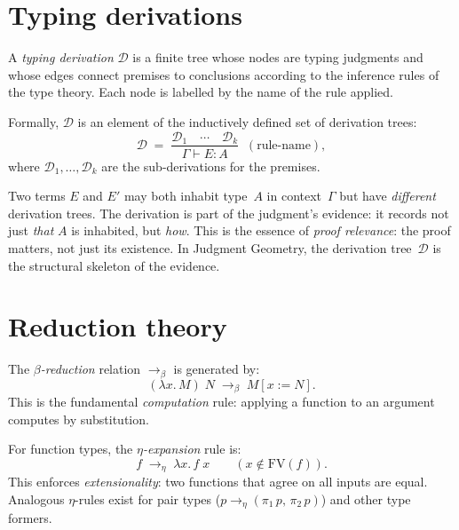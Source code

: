 \section{Typing derivations}
\label{sec:derivations}

\begin{definition}
\label{def:derivation}
A \emph{typing derivation} $\mathcal{D}$ is a finite tree whose nodes
are typing judgments and whose edges connect premises to conclusions
according to the inference rules of the type theory.  Each node is
labelled by the name of the rule applied.

Formally, $\mathcal{D}$ is an element of the inductively defined set
of derivation trees:
\[
  \mathcal{D} \;=\;
  \frac{\mathcal{D}_1 \quad \cdots \quad \mathcal{D}_k}
  {\Gamma \vdash E : A}\;\; (\text{rule-name}),
\]
where $\mathcal{D}_1, \ldots, \mathcal{D}_k$ are the sub-derivations
for the premises.
\end{definition}

\begin{remark}
\label{rem:proof-relevance}
Two terms $E$ and $E'$ may both inhabit type~$A$ in context~$\Gamma$
but have \emph{different} derivation trees.  The derivation is
part of the judgment's evidence: it records not just \emph{that} $A$ is
inhabited, but \emph{how}.  This is the essence of
\emph{proof relevance}: the proof matters, not just its existence.
In Judgment Geometry, the derivation tree~$\mathcal{D}$ is the
structural skeleton of the evidence.
\end{remark}

\section{Reduction theory}
\label{sec:reduction}

\begin{definition}
\label{def:beta}
The \emph{$\beta$-reduction} relation $\to_\beta$ is generated by:
\[
  (\lambda x.\, M)\; N \;\to_\beta\; M[x := N].
\]
This is the fundamental \emph{computation} rule: applying a function
to an argument computes by substitution.
\end{definition}

\begin{definition}
\label{def:eta}
For function types, the \emph{$\eta$-expansion} rule is:
\[
  f \;\to_\eta\; \lambda x.\, f\; x
  \qquad (x \notin \mathrm{FV}(f)).
\]
This enforces \emph{extensionality}: two functions that agree on all
inputs are equal.  Analogous $\eta$-rules exist for pair types
($p \to_\eta (\pi_1\, p,\, \pi_2\, p)$) and other type formers.
\end{definition}


